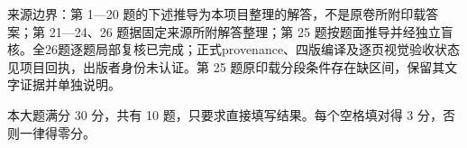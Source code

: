 

\begin{gktip}
来源边界：第 1—20 题的下述推导为本项目整理的解答，不是原卷所附印载答案；第 21—24、26 题据固定来源所附解答整理；第 25 题按题面推导并经独立盲核。全26题逐题局部复核已完成；正式provenance、四版编译及逐页视觉验收状态见项目回执，出版者身份未认证。第 25 题原印载分段条件存在缺区间，保留其文字证据并单独说明。
\end{gktip}


本大题满分 30 分，共有 10 题，只要求直接填写结果。每个空格填对得 3 分，否则一律得零分。


